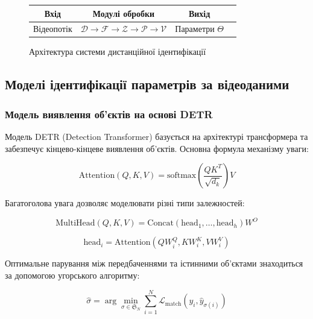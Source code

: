 \documentclass[14pt, a4paper]{extarticle}
\numberwithin{equation}{section}
\begin{document}
\begin{figure}[H]
\centering
\begin{tabular}{|c|c|c|c|}
\hline
\textbf{Вхід} & \textbf{Модулі обробки} & \textbf{Вихід} \\
\hline
Відеопотік & $\mathcal{D} \rightarrow \mathcal{F} \rightarrow \mathcal{Z} \rightarrow \mathcal{P} \rightarrow \mathcal{V}$ & Параметри $\Theta$ \\
\hline
\end{tabular}
\caption{Архітектура системи дистанційної ідентифікації}
\label{fig:architecture}
\end{figure}

\subsection{Моделі ідентифікації параметрів за відеоданими}

\subsubsection{Модель виявлення об'єктів на основі DETR}

Модель DETR (Detection Transformer) базується на архітектурі трансформера та забезпечує кінцево-кінцеве виявлення об'єктів. Основна формула механізму уваги:

\begin{equation}
\boxed{\text{Attention}(Q, K, V) = \text{softmax}\left(\frac{QK^T}{\sqrt{d_k}}\right)V} \tag{3.7}
\end{equation}

Багатоголова увага дозволяє моделювати різні типи залежностей:

\begin{equation}
\boxed{\text{MultiHead}(Q, K, V) = \text{Concat}(\text{head}_1, \ldots, \text{head}_h) W^O} \tag{3.8}
\end{equation}

\begin{equation}
\text{head}_i = \text{Attention}(QW_i^Q, KW_i^K, VW_i^V) \tag{3.9}
\end{equation}

Оптимальне парування між передбаченнями та істинними об'єктами знаходиться за допомогою угорського алгоритму:

\begin{equation}
\hat{\sigma} = \arg\min_{\sigma \in \mathfrak{S}_N} \sum_{i=1}^N \mathcal{L}_{\text{match}}(y_i, \hat{y}_{\sigma(i)}) \tag{3.10}
\end{equation}
\end{document}
